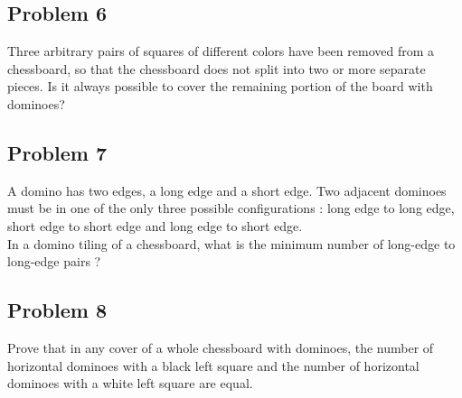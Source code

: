 \documentclass[12pt,a4paper,article,english,firamath]{nsi}
\begin{document}
\subsection*{Problem 6}

Three arbitrary pairs of squares of different colors have been removed from a chessboard, so that the chessboard does not split into two or more separate pieces. Is it always possible to cover the remaining portion of the board with
dominoes?

\subsection*{Problem 7}

A domino has two edges, a long edge and a short edge. Two adjacent dominoes must be in one of the only three possible
configurations : long edge to long edge, short edge to short edge and long edge to short edge.\\ In a domino tiling of a
chessboard, what is the minimum number of long-edge to long-edge pairs ?

\subsection*{Problem 8}

Prove that in any cover of a whole chessboard with dominoes, the number of horizontal
dominoes with a black left square and the number of horizontal dominoes with a white left square are equal.
\end{document}
